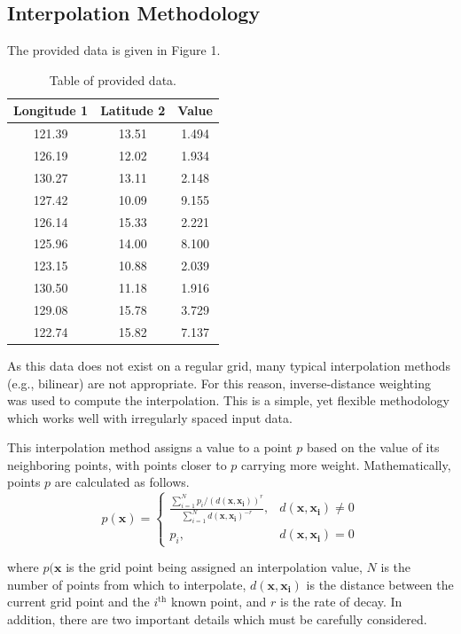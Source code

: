 \documentclass{article}
\begin{document}
\subsection{Interpolation Methodology}
The provided data is given in Figure 1.
\begin{table}[h] 
    \centering
    \label{tab:example}
    \begin{tabular}{|c|c|c|} 
        \hline 
        \textbf{Longitude} 1 & \textbf{Latitude} 2 & \textbf{Value} \\ 
        \hline
        121.39 & 13.51 & 1.494 \\ 
        126.19 & 12.02 & 1.934 \\
        130.27 & 13.11 & 2.148 \\
        127.42 & 10.09 & 9.155 \\
        126.14 & 15.33 & 2.221 \\
        125.96 & 14.00 & 8.100 \\
        123.15 & 10.88 & 2.039 \\
        130.50 & 11.18 & 1.916 \\
        129.08 & 15.78 & 3.729 \\
        122.74 & 15.82 & 7.137 \\
        \hline
    \end{tabular}
    \caption{Table of provided data.}
\end{table}

\vspace{-5mm}
As this data does not exist on a regular grid, many typical interpolation methods 
(e.g., bilinear) are not appropriate. For this reason, inverse-distance weighting 
was used to compute the interpolation. This is a simple, yet flexible methodology 
which works well with irregularly spaced input data. 

This interpolation method assigns a value to a point $p$ based on the value of its 
neighboring points, with points closer to $p$ carrying more weight. Mathematically, 
points $p$ are calculated as follows.
\begin{equation}
    p(\bm{x}) = \begin{cases}
        \frac{ \sum_{i=1}^{N} p_i/ \left(d(\bm{x,x_i})\right)^r}{ \sum_{i=1}^{N} d(\bm{x,x_i})^{-r}} , & d(\bm{x,x_i}) \neq 0 \\
        p_i, & d(\bm{x,x_i}) = 0
    \end{cases}
\end{equation}

where $p(\bm{x}$ is the grid point being assigned an interpolation value, $N$ is the 
number of points from which to interpolate, $d(\bm{x,x_i})$ is the distance between 
the current grid point and the $i^\text{th}$ known point, and $r$ is the rate of 
decay. In addition, there are two important details which must be carefully considered. 
\end{document}
